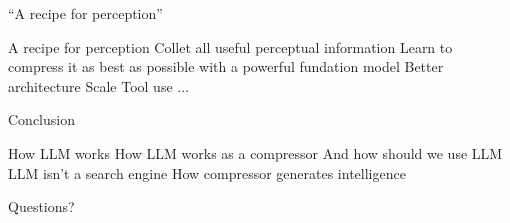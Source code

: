\documentclass[scheme=plain]{ctexbeamer}
\begin{document}
\begin{frame}{``A recipe for perception''}
  \begin{outline}
    \0 A recipe for perception
      \1 Collet all useful perceptual information
      \1 Learn to compress it as best as possible with a powerful fundation model
        \2 Better architecture
        \2 Scale
        \2 Tool use
        \2 ...
  \end{outline}
\end{frame}


\begin{frame}{Conclusion}
  \begin{outline}
    \1 How LLM works
    \1 How LLM works as a compressor
      \2 And how should we use LLM
      \2 LLM isn't a search engine
    \1 How compressor generates intelligence
  \end{outline}
\end{frame}

\begin{frame}[standout]
  Questions?
\end{frame}
\end{document}
